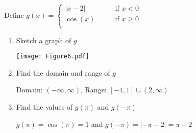\documentclass[nooutcomes, noinstructornotes]{ximera}
\begin{document}
\begin{problem}
Define 
	$g(x) =   \left\{ \begin{array}{cl}
	|x-2|		 	&	\qquad \text{if } x < 0					\\
	\cos(x)			&	\qquad \text{if }  x \geq 0  	\\		\end{array} \right.  $
\begin{enumerate}	
	\item  Sketch a graph of $g$
		\begin{freeResponse} \hfil
			\begin{image}			
			\texttt{[image: Figure6.pdf]}
			\end{image}

		\end{freeResponse}

	\item  Find the domain and range of $g$
		\begin{freeResponse}	
			Domain: $(-\infty,\infty)$, Range: $[-1,1]\cup(2,\infty)$
		\end{freeResponse}		
	
	\item  Find the values of $g(\pi)$ and $g(-\pi)$
		\begin{freeResponse}	
			$g(\pi)=\cos (\pi)=1$ and $g(-\pi)=|-\pi-2|=\pi+2$
		\end{freeResponse}
	
	\end{enumerate}

\end{problem}

\begin{instructorNotes}

\end{instructorNotes}
\end{document}

